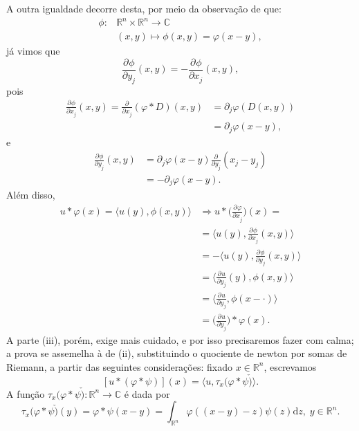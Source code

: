 \documentclass[../distribution_theory_notes.tex]{subfiles}
\begin{document}
\begin{proof*}
	A outra igualdade decorre desta, por meio da observação de que:
	\begin{align*}
		\phi: & \mathbb{R}^{n}\times \mathbb{R}^{n}\rightarrow \mathbb{C} \\
		      & (x, y)\longmapsto \phi (x, y) = \varphi(x-y),
	\end{align*}
	já vimos que
	\[
		\frac{\partial^{}\phi}{\partial y_{j}^{}}(x, y) = - \frac{\partial^{}\phi}{\partial x_{j}^{}}(x, y),
	\]
	pois
	\begin{align*}
		\frac{\partial^{}\phi}{\partial x_{j}^{}}(x, y) = \frac{\partial^{}}{\partial x_{j}^{}}(\varphi *D)(x, y) & = \partial_{j}\varphi(D(x, y)) \\
		                                                                                                          & = \partial_{j}\varphi (x-y),
	\end{align*}
	e
	\begin{align*}
		\frac{\partial^{}\phi}{\partial y_{j}^{}}(x, y) & = \partial_{j}\varphi(x-y)\frac{\partial^{}}{\partial y_{j}^{}}(x_{j}-y_{j}) \\
		                                                & = -\partial_{j}\varphi (x-y).
	\end{align*}
	Além disso,
	\begin{align*}
		u*\varphi (x)=\langle u(y), \phi(x, y) \rangle & \Rightarrow u*\biggl(\frac{\partial^{}\varphi }{\partial x_{j}^{}}\biggr)(x)=         \\
		                                               & = \biggl\langle u(y), \frac{\partial^{}\phi}{\partial x_{j}^{}}(x, y) \biggr\rangle   \\
		                                               & = - \biggl\langle u(y), \frac{\partial^{}\phi}{\partial y_{j}^{}}(x, y) \biggr\rangle \\
		                                               & = \biggl\langle \frac{\partial^{}u}{\partial y_{j}^{}}(y), \phi(x, y) \biggr\rangle   \\
		                                               & = \biggl\langle \frac{\partial^{}u}{\partial y_{j}^{}}, \phi(x-\cdot ) \biggr\rangle  \\
		                                               & = \biggl(\frac{\partial^{}u}{\partial y_{j}^{}}\biggr)*\varphi (x).
	\end{align*}
	A parte (iii), porém, exige mais cuidado, e por isso precisaremos fazer com calma; a prova se assemelha à de (ii), substituindo o quociente de newton por somas de Riemann, a partir das seguintes considerações: fixado \(x\in \mathbb{R}^{n}\), escrevamos
	\[
		[u*(\varphi *\psi )](x) = \langle u, \tau_{x}(\varphi*\psi \check{)} \rangle.
	\]
	A função \(\tau_{x}(\varphi *\psi \check{)}:\mathbb{R}^{n}\rightarrow \mathbb{C}\) é dada por
	\[
		\tau_{x}(\varphi*\psi \check{)}(y) = \varphi*\psi (x-y) = \int_{\mathbb{R}^{n}}^{}\varphi ((x-y)-z)\psi (z) \mathrm{d}z,\; y\in \mathbb{R}^{n}.
	\]


\end{proof*}
\end{document}
